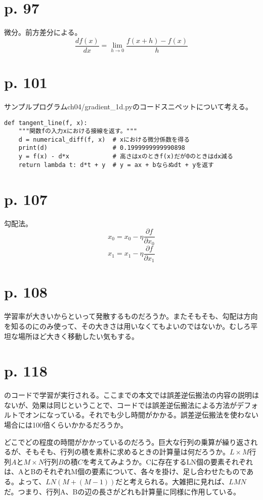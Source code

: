 \documentclass[uplatex,dvipdfmx]{jsarticle} \usepackage{amsmath,amssymb,bm}
\begin{document}
\section*{p. 97}
微分。前方差分による。
$$\frac{df(x)}{dx}=\lim_{h\to0}\frac{f(x+h)-f(x)}{h}$$


\section*{p. 101}
サンプルプログラムch04/gradient\_1d.pyのコードスニペットについて考える。
\begin{verbatim}
def tangent_line(f, x):
    """関数fの入力xにおける接線を返す。"""
    d = numerical_diff(f, x)  # xにおける微分係数を得る
    print(d)                  # 0.1999999999990898
    y = f(x) - d*x            # 高さはxのときf(x)だが0のときはdx減る
    return lambda t: d*t + y  # y = ax + bならぬdt + yを返す
\end{verbatim}


\section*{p. 107}
勾配法。
$$x_0=x_0-\eta\frac{\partial f}{\partial x_0}$$
$$x_1=x_1-\eta\frac{\partial f}{\partial x_1}$$

\section*{p. 108}
学習率が大きいからといって発散するものだろうか。またそもそも、勾配は方向を知るのにのみ使って、その大きさは用いなくてもよいのではないか。むしろ平坦な場所ほど大きく移動したい気もする。

\section*{p. 118}
のコードで学習が実行される。ここまでの本文では誤差逆伝搬法の内容の説明はないが、効果は同じということで、コードでは誤差逆伝搬法による方法がデフォルトでオンになっている。それでも少し時間がかかる。誤差逆伝搬法を使わない場合には100倍くらいかかるだろうか。

どこでどの程度の時間がかかっているのだろう。巨大な行列の乗算が繰り返されるが、そもそも、行列の積を素朴に求めるときの計算量は何だろうか。$L\times M$行列$A$と$M\times N$行列$B$の積$C$を考えてみようか。Cに存在するLN個の要素それぞれは、AとBのそれぞれM個の要素について、各々を掛け、足し合わせたものである。よって、$LN(M+(M-1))$だと考えられる。大雑把に見れば、$LMN$だ。つまり、行列A、Bの辺の長さがどれも計算量に同様に作用している。
\end{document}

